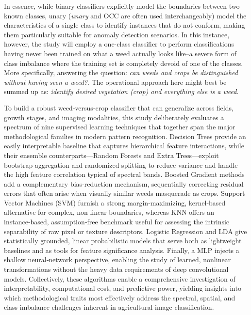 \documentclass[letterpaper, notitlepage]{report}
\begin{document}
In essence, while binary classifiers explicitly model the boundaries between two known classes, unary (\textit{unary} and \gls{OCC} are often used interchangeably) model the characteristics of a single class to identify instances that do not conform, making them particularly suitable for anomaly detection scenarios. In this instance, however, the study will employ a one-class classifier to perform classifications having never been trained on what a weed actually looks like--a severe form of class imbalance where the training set is completely devoid of one of the classes. More specifically, answering the question: \textit{can weeds and crops be distinguished without having seen a weed?}. The operational approach here might best be summed up as: \textit{identify desired vegetation (crop) and everything else is a weed}.

To build a robust weed‑versus‑crop classifier that can generalize across fields, growth stages, and imaging modalities, this study  deliberately evaluates a spectrum of nine supervised learning techniques that together span the major methodological families in modern pattern recognition. Decision Trees provide an easily interpretable baseline that captures hierarchical feature interactions, while their ensemble counterparts—Random Forests and Extra Trees—exploit bootstrap aggregation and randomized splitting to reduce variance and handle the high feature correlation typical of spectral bands. Boosted Gradient methods add a complementary bias‑reduction mechanism, sequentially correcting residual errors that often arise when visually similar weeds masquerade as crops. Support Vector Machines (SVM) furnish a strong margin‑maximizing, kernel‑based alternative for complex, non‑linear boundaries, whereas \gls{KNN} offers an instance‑based, assumption‑free benchmark useful for assessing the intrinsic separability of raw pixel or texture descriptors. Logistic Regression and \gls{LDA} give statistically grounded, linear probabilistic models that serve both as lightweight baselines and as tools for feature significance analysis. Finally, a \gls{MLP} injects a shallow neural‑network perspective, enabling the study of learned, nonlinear transformations without the heavy data requirements of deep convolutional models. Collectively, these algorithms enable a comprehensive investigation of interpretability, computational cost, and predictive power, yielding insights into which methodological traits most effectively address the spectral, spatial, and class‑imbalance challenges inherent in agricultural image classification.
\end{document}
